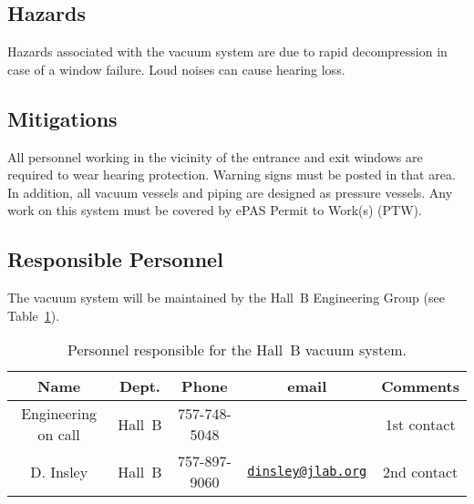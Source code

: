 \subsection{Hazards} 

Hazards associated with the vacuum system are due to rapid decompression in case of a window 
failure. Loud noises can cause hearing loss. 

\subsection{Mitigations}

All personnel working in the vicinity of the entrance and exit windows are required to wear 
hearing protection. Warning signs must be posted in that area. In addition, all vacuum vessels 
and piping are designed as pressure vessels.  Any work on this system must be covered by ePAS
Permit to Work(s) (PTW).

\subsection{Responsible Personnel}

The vacuum system will be maintained by the Hall~B Engineering Group (see
Table~\ref{tb:vacuum}).  

\begin{table}[!htb]
\centering
\begin{tabular}{|c|c|c|c|c|} \hline
Name&Dept.&Phone&email&Comments \\ \hline
Engineering on call & Hall~B& 757-748-5048&& 1st contact  \\ \hline
D. Insley & Hall~B  &757-897-9060&\href{mailto:dinsley@jlab.org}{\nolinkurl{dinsley@jlab.org}}  &2nd contact \\ \hline
 \end{tabular}
\caption{Personnel responsible for the Hall~B vacuum system.} 
\label{tb:vacuum}
\end{table}

